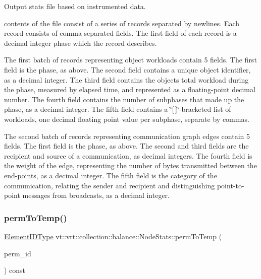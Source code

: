 Output stats file based on instrumented data. 

contents of the file consist of a series of records separated by newlines. Each record consists of comma separated fields. The first field of each record is a decimal integer phase which the record describes.

The first batch of records representing object workloads contain 5 fields. The first field is the phase, as above. The second field contains a unique object identifier, as a decimal integer. The third field contains the object\textquotesingle{}s total workload during the phase, measured by elapsed time, and represented as a floating-\/point decimal number. The fourth field contains the number of subphases that made up the phase, as a decimal integer. The fifth field contains a \char`\"{}\mbox{[}$\,$\mbox{]}\char`\"{}-\/bracketed list of workloads, one decimal floating point value per subphase, separate by commas.

The second batch of records representing communication graph edges contain 5 fields. The first field is the phase, as above. The second and third fields are the recipient and source of a communication, as decimal integers. The fourth field is the weight of the edge, representing the number of bytes transmitted between the end-\/points, as a decimal integer. The fifth field is the category of the communication, relating the sender and recipient and distinguishing point-\/to-\/point messages from broadcasts, as a decimal integer. \mbox{\label{structvt_1_1vrt_1_1collection_1_1balance_1_1_node_stats_a6e13d373b5365771b1f08fc0bd5c0bda}} 
\subsubsection{\texorpdfstring{perm\+To\+Temp()}{permToTemp()}}
{\footnotesize\ttfamily \hyperlink{namespacevt_1_1vrt_1_1collection_1_1balance_a14c8d2c972f2913aa3f1636e5be0a120}{Element\+I\+D\+Type} vt\+::vrt\+::collection\+::balance\+::\+Node\+Stats\+::perm\+To\+Temp (\begin{DoxyParamCaption}\item[{\hyperlink{namespacevt_1_1vrt_1_1collection_1_1balance_a14c8d2c972f2913aa3f1636e5be0a120}{Element\+I\+D\+Type}}]{perm\+\_\+id }\end{DoxyParamCaption}) const}



